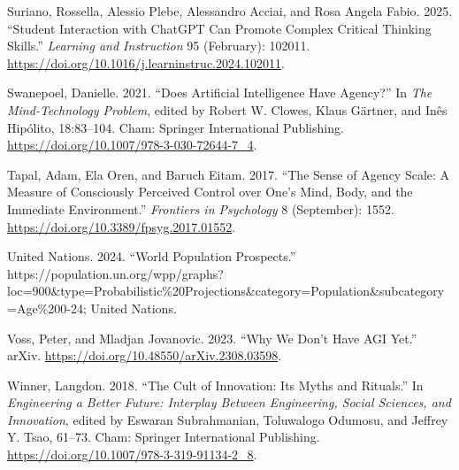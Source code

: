\documentclass[
  letterpaper,
  DIV=11,
  numbers=noendperiod]{scrartcl}
\newlength{\cslhangindent}
\newenvironment{CSLReferences}[2] %
 {\begin{list}{}{%
  \setlength{\itemindent}{0pt}
  \setlength{\leftmargin}{0pt}
  \setlength{\parsep}{0pt}
  \ifodd #1
   \setlength{\leftmargin}{\cslhangindent}
   \setlength{\itemindent}{-1\cslhangindent}
  \fi
  \setlength{\itemsep}{#2\baselineskip}}}
 {\end{list}}
\begin{document}
\begin{CSLReferences}{1}{0}
Suriano, Rossella, Alessio Plebe, Alessandro Acciai, and Rosa Angela
Fabio. 2025. {``Student Interaction with {ChatGPT} Can Promote Complex
Critical Thinking Skills.''} \emph{Learning and Instruction} 95
(February): 102011.
\url{https://doi.org/10.1016/j.learninstruc.2024.102011}.

Swanepoel, Danielle. 2021. {``Does {Artificial Intelligence Have
Agency}?''} In \emph{The {Mind-Technology Problem}}, edited by Robert W.
Clowes, Klaus Gärtner, and Inês Hipólito, 18:83--104. Cham: Springer
International Publishing.
\url{https://doi.org/10.1007/978-3-030-72644-7_4}.

Tapal, Adam, Ela Oren, and Baruch Eitam. 2017. {``The Sense of Agency
Scale: A Measure of Consciously Perceived Control over One's Mind, Body,
and the Immediate Environment.''} \emph{Frontiers in Psychology} 8
(September): 1552. \url{https://doi.org/10.3389/fpsyg.2017.01552}.

United Nations. 2024. {``World {Population Prospects}.''}
https://population.un.org/wpp/graphs?loc=900\&type=Probabilistic\%20Projections\&category=Population\&subcategory=Age\%200-24;
United Nations.

Voss, Peter, and Mladjan Jovanovic. 2023. {``Why {We Don}'t {Have AGI
Yet}.''} arXiv. \url{https://doi.org/10.48550/arXiv.2308.03598}.

Winner, Langdon. 2018. {``The {Cult} of {Innovation}: {Its Myths} and
{Rituals}.''} In \emph{Engineering a {Better Future}: {Interplay}
Between {Engineering}, {Social Sciences}, and {Innovation}}, edited by
Eswaran Subrahmanian, Toluwalogo Odumosu, and Jeffrey Y. Tsao, 61--73.
Cham: Springer International Publishing.
\url{https://doi.org/10.1007/978-3-319-91134-2_8}.

\end{CSLReferences}
\end{document}
